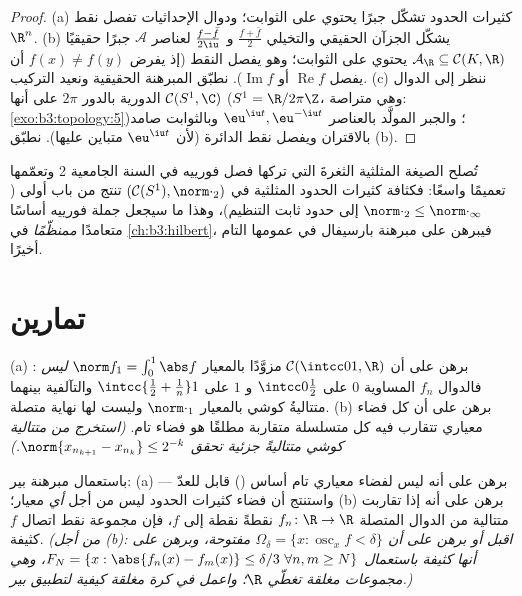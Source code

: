 \begin{proof}
(a) كثيرات الحدود تشكّل جبرًا يحتوي على الثوابت؛ ودوال
الإحداثيات تفصل نقط $\R^n$.
(b) يشكّل الجزآن الحقيقي والتخيلي $\frac{f + \bar f}2$ و $\frac{f - \bar f}{2\iu}$ لعناصر
$\mathcal A$ جبرًا حقيقيًا $\mathcal A_\R \subseteq \mathcal C(K, \R)$ يحتوي على الثوابت؛ وهو يفصل
النقط (إذ يفرض $f(x) \ne f(y)$ أن يفصل $\operatorname{Re}f$ أو $\operatorname{Im}f$).
نطبّق المبرهنة الحقيقية ونعيد التركيب.
(c) ننظر إلى الدوال الدورية بالدور $2\pi$ على أنها $\mathcal C(S^1, \C)$
($S^1 = \R/2\pi\Z$، وهي متراصة: \cref{exo:b3:topology:5})؛ والجبر المولَّد بالعناصر $\eu^{\iu t}, \eu^{-\iu t}$
وبالثوابت صامد بالاقتران ويفصل نقط الدائرة (لأن $\eu^{\iu t}$
متباين عليها). نطبّق (b).
\end{proof}

\begin{remark}\label{rem:b3:complete:swremark}
تُصلح الصيغة المثلثية الثغرةَ التي تركها فصل فورييه في السنة
الجامعية 2 وتعمّمها تعميمًا واسعًا: فكثافة كثيرات الحدود
المثلثية في $(\mathcal C(S^1), \norm\cdot_2)$ تنتج من باب أولى ($\norm\cdot_2 \leq \norm\cdot_\infty$ إلى حدود ثابت
التنظيم)، وهذا ما سيجعل جملة فورييه أساسًا متعامدًا
\emph{ممنظّمًا} في \cref{ch:b3:hilbert}، فيبرهن على مبرهنة بارسيفال في
عمومها التام أخيرًا.
\end{remark}

\section{تمارين}

\begin{exercise}[$\star$]\label{exo:b3:complete:1}
(a) برهن على أن $\mathcal C(\intcc01, \R)$ مزوَّدًا بالمعيار $\norm f_1 = \int_0^1\abs f$ \emph{ليس} :
فالدوال $f_n$ المساوية $0$ على $\intcc0{\frac12}$ و $1$ على $\intcc{\frac12 + \frac1n}1$
والتآلفية بينهما متتاليةُ كوشي بالمعيار $\norm\cdot_1$ وليست لها
نهاية متصلة.
(b) برهن على أن كل فضاء معياري تتقارب فيه كل متسلسلة متقاربة
مطلقًا هو فضاء تام. \emph{(استخرج من متتالية كوشي متتاليةً
جزئية تحقق $\norm{x_{n_{k+1}} -
x_{n_k}} \leq 2^{-k}$.)}
\end{exercise}

\begin{exercise}[$\star$]\label{exo:b3:complete:2}
باستعمال مبرهنة بير: (a) برهن على أنه ليس لفضاء معياري تام أساس
() قابل للعدّ --- واستنتج أن فضاء كثيرات الحدود ليس  من
أجل \emph{أي} معيار؛ (b) برهن على أنه إذا تقاربت متتالية من
الدوال المتصلة $f_n \colon \R \to \R$ نقطةً نقطة إلى $f$، فإن مجموعة نقط
اتصال $f$ كثيفة. \emph{(من أجل (b): اقبل أو برهن على أن $\Omega_\delta = \{x :
\operatorname{osc}_x f < \delta\}$
مفتوحة، وبرهن على أنها كثيفة باستعمال $F_{N} = \{x: \abs{f_n(x) - f_m(x)} \leq \delta/3\
\forall n,m \geq N\}$، وهي مجموعات
مغلقة تغطّي $\R$؛ واعمل في كرة مغلقة كيفية لتطبيق بير.)}
\end{exercise}

